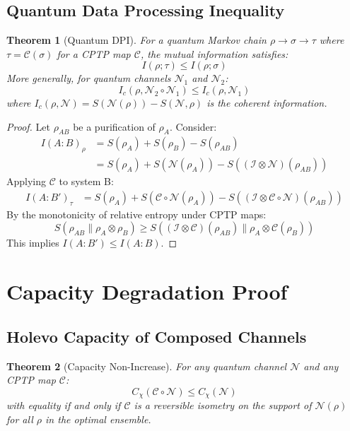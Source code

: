 \documentclass[12pt]{article}
\newtheorem{theorem}{Theorem}
\begin{document}
\subsection{Quantum Data Processing Inequality}
\begin{theorem}[Quantum DPI]
For a quantum Markov chain $\rho \to \sigma \to \tau$ where $\tau = \mathcal{C}(\sigma)$ for a CPTP map $\mathcal{C}$, the mutual information satisfies:
\[
I(\rho; \tau) \leq I(\rho; \sigma)
\]
More generally, for quantum channels $\mathcal{N}_1$ and $\mathcal{N}_2$:
\[
I_c(\rho, \mathcal{N}_2 \circ \mathcal{N}_1) \leq I_c(\rho, \mathcal{N}_1)
\]
where $I_c(\rho, \mathcal{N}) = S(\mathcal{N}(\rho)) - S(\mathcal{N}, \rho)$ is the coherent information.
\end{theorem}

\begin{proof}
Let $\rho_{AB}$ be a purification of $\rho_A$. Consider:
\begin{align*}
I(A:B)_{\rho} &= S(\rho_A) + S(\rho_B) - S(\rho_{AB}) \\
&= S(\rho_A) + S(\mathcal{N}(\rho_A)) - S((\mathcal{I} \otimes \mathcal{N})(\rho_{AB}))
\end{align*}
Applying $\mathcal{C}$ to system B:
\begin{align*}
I(A:B')_{\tau} &= S(\rho_A) + S(\mathcal{C} \circ \mathcal{N}(\rho_A)) - S((\mathcal{I} \otimes \mathcal{C} \circ \mathcal{N})(\rho_{AB}))
\end{align*}
By the monotonicity of relative entropy under CPTP maps:
\[
S(\rho_{AB} \| \rho_A \otimes \rho_B) \geq S((\mathcal{I} \otimes \mathcal{C})(\rho_{AB}) \| \rho_A \otimes \mathcal{C}(\rho_B))
\]
This implies $I(A:B') \leq I(A:B)$.
\end{proof}

\section{Capacity Degradation Proof}

\subsection{Holevo Capacity of Composed Channels}
\begin{theorem}[Capacity Non-Increase]
For any quantum channel $\mathcal{N}$ and any CPTP map $\mathcal{C}$:
\[
C_{\chi}(\mathcal{C} \circ \mathcal{N}) \leq C_{\chi}(\mathcal{N})
\]
with equality if and only if $\mathcal{C}$ is a reversible isometry on the support of $\mathcal{N}(\rho)$ for all $\rho$ in the optimal ensemble.
\end{theorem}
\end{document}
